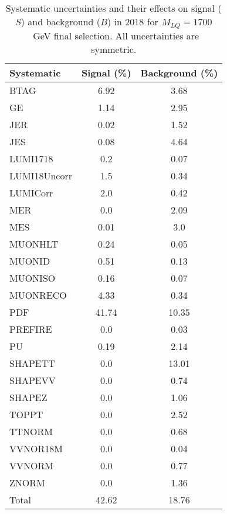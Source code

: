 \begin{table}[htbp]
\begin{center}
\caption{Systematic uncertainties and their effects on signal ($S$) and background ($B$) in 2018 for $M_{LQ}=1700$~GeV final selection. All uncertainties are symmetric.}
\begin{tabular}{lcc}
\hline\hline
Systematic & Signal (\%) & Background (\%) \\ \hline 
BTAG & 6.92 & 3.68\\ 
GE & 1.14 & 2.95\\ 
JER & 0.02 & 1.52\\ 
JES & 0.08 & 4.64\\ 
LUMI1718 & 0.2 & 0.07\\ 
LUMI18Uncorr & 1.5 & 0.34\\ 
LUMICorr & 2.0 & 0.42\\ 
MER & 0.0 & 2.09\\ 
MES & 0.01 & 3.0\\ 
MUONHLT & 0.24 & 0.05\\ 
MUONID & 0.51 & 0.13\\ 
MUONISO & 0.16 & 0.07\\ 
MUONRECO & 4.33 & 0.34\\ 
PDF & 41.74 & 10.35\\ 
PREFIRE & 0.0 & 0.03\\ 
PU & 0.19 & 2.14\\ 
SHAPETT & 0.0 & 13.01\\ 
SHAPEVV & 0.0 & 0.74\\ 
SHAPEZ & 0.0 & 1.06\\ 
TOPPT & 0.0 & 2.52\\ 
TTNORM & 0.0 & 0.68\\ 
VVNOR18M & 0.0 & 0.04\\ 
VVNORM & 0.0 & 0.77\\ 
ZNORM & 0.0 & 1.36\\ 
Total & 42.62 & 18.76\\ \hline \hline
\end{tabular}
\label{tab:SysUncertainties_uujj_1700}
\end{center}
\end{table}

